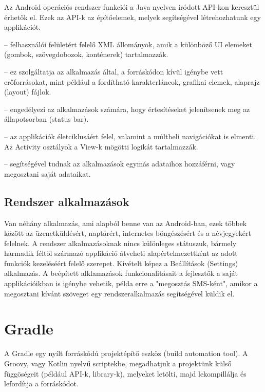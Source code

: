 Az Android operációs rendszer funkciói a Java nyelven íródott API-kon keresztül érhetők el. Ezek az API-k az építőelemek, melyek segítségével létrehozhatunk egy applikációt.

\begin{description}
	\setlength{\itemsep}{0.04mm}
	\item[View rendszer] -- felhasználói felületért felelő XML állományok, amik a különböző UI elemeket (gombok, szövegdobozok, konténerek) tartalmazzák.
	\item[Erőforráskezelő (Resource Manager)] -- ez szolgáltatja az alkalmazás által, a forráskódon kívül igénybe vett erőforrásokat, mint például a fordítható karakterláncok, grafikai elemek, alaprajz (layout) fájlok.
	\item[Értesítéskezelő (Notification Manager)] -- engedélyezi az alkalmazások számára, hogy értesítéseket jelenítsenek meg az állapotsorban (status bar).
	\item[Activity-kezelő] -- az applikációk életciklusáért felel, valamint a múltbeli navigációkat is elmenti. Az Activity osztályok a View-k mögötti logikát tartalmazzák.
	\item[Tartalom szolgáltató (Content Provider)] -- segítségével tudnak az alkalmazások egymás adataihoz hozzáférni, vagy megosztani saját adataikat.
\end{description}

\subsection{Rendszer alkalmazások}

Van néhány alkalmazás, ami alapból benne van az Android-ban, ezek többek között az üzenetküldésért, naptárért, internetes böngészésért és a névjegyekért felelnek. A rendszer alkalmazásoknak nincs különleges státuszuk, bármely harmadik féltől származó applikáció átveheti alapértelmezettként az adott funkciók kezeléséért felelő szerepet. Kivételt képez a Beállítások (Settings) alkalmazás. A beépített alklamazások funkcionalitásait a fejlesztők a saját applikációikban is igénybe vehetik, példa erre a "megosztás SMS-ként", amikor a megosztani kívánt szöveget egy rendszeralkalmazás segítségével küldik el.


\section{Gradle}

A Gradle\cite{gradle} egy nyílt forráskódú projektépítő eszköz (build automation tool). A Groovy, vagy Kotlin nyelvű scriptekbe, megadhatjuk a projektünk külső függöségeit (például API-k, library-k), melyeket letölti, majd lekompillálja és lefordítja a forráskódot.

